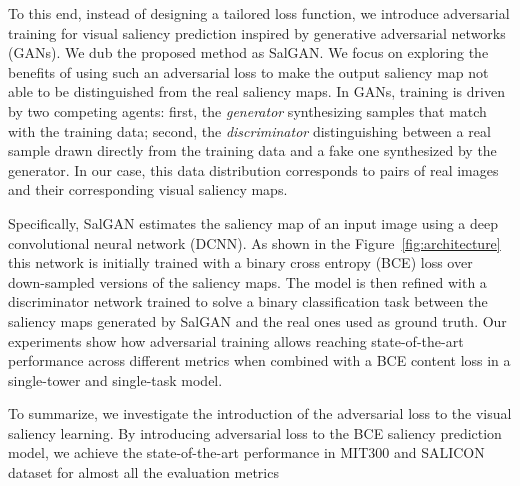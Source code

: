 \documentclass[times,twocolumn,final,authoryear]{elsarticle}
\begin{document}

To this end, instead of designing  a tailored loss function, we introduce adversarial training for visual saliency prediction inspired by generative adversarial networks (GANs)\citep{goodfellow2014generative}. We dub the proposed method as SalGAN. We focus on exploring the benefits of using such an adversarial loss to make the output saliency map not able to be distinguished from the real saliency maps. 
In GANs, training is driven by two competing agents: first, the \textit{generator} synthesizing samples that match with the training data; second, the \textit{discriminator} distinguishing between a real sample drawn directly from the training data and a fake one synthesized by the generator. In our case, this data distribution corresponds to pairs of real images and their corresponding visual saliency maps. 

Specifically, SalGAN estimates the saliency map of an input image using a deep convolutional neural network (DCNN). As shown in the Figure~\ref{fig:architecture} this network is initially trained with a binary cross entropy (BCE) loss over down-sampled versions of the saliency maps. The model is then refined with a discriminator network trained to solve a binary classification task between the saliency maps generated by SalGAN and the real ones used as ground truth. Our experiments show how adversarial training allows reaching state-of-the-art performance across different metrics when combined with a BCE content loss in a single-tower and single-task model. 


To summarize, we investigate the introduction of the adversarial loss to the visual saliency learning. By introducing adversarial loss to the BCE saliency prediction model, we achieve the state-of-the-art performance in MIT300 and SALICON dataset for almost all the evaluation metrics
\end{document}
